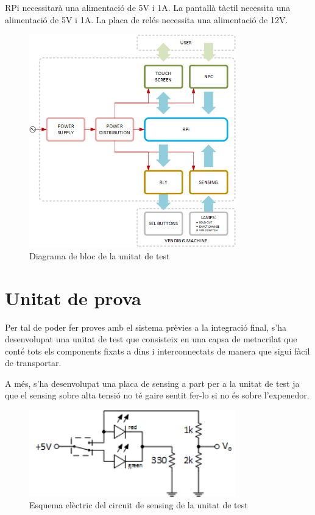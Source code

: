 RPi necessitarà una alimentació de 5V i 1A.
La pantallà tàctil necessita una alimentació de 5V i 1A.
La placa de relés necessita una alimentació de 12V.

\begin{figure}[H]
\center
\includegraphics[width=0.8\textwidth]{images/block_diagram}
\caption{Diagrama de bloc de la unitat de test}
\label{fig:block_diagram}
\end{figure}

\section{Unitat de prova}
Per tal de poder fer proves amb el sistema prèvies a la integració final, s'ha desenvolupat una unitat de test que consisteix en una capsa de metacrilat que conté tots els components fixats a dins i interconnectats de manera que sigui fàcil de transportar.

A més, s'ha desenvolupat una placa de sensing a part per a la unitat de test ja que el sensing sobre alta tensió no té gaire sentit fer-lo si no és sobre l'expenedor.

\begin{figure}[H]
\center
\includegraphics[width=0.8\textwidth]{images/sensing_demonstrator}
\caption{Esquema elèctric del circuit de sensing de la unitat de test}
\label{fig:sensing_demonstrator_board}
\end{figure}

